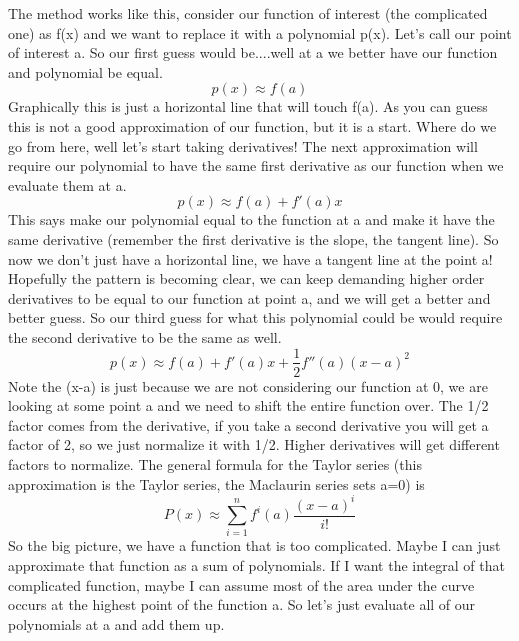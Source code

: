 \documentclass{article}
\begin{document}
The method works like this, consider our function of interest (the complicated one) as f(x) and we want to replace it with a polynomial p(x). 
Let's call our point of interest a. 
So our first guess would be....well at a we better have our function and polynomial be equal.
\begin{equation}
    p(x) \approx f(a)
\end{equation}
Graphically this is just a horizontal line that will touch f(a). 
As you can guess this is not a good approximation of our function, but it is a start. 
Where do we go from here, well let's start taking derivatives!
The next approximation will require our polynomial to have the same first derivative as our function when we evaluate them at a. 
\begin{equation}
    p(x) \approx f(a) + f'(a)x
\end{equation}
This says make our polynomial equal to the function at a and make it have the same derivative (remember the first derivative is the slope, the tangent line). 
So now we don't just have a horizontal line, we have a tangent line at the point a!
Hopefully the pattern is becoming clear, we can keep demanding higher order derivatives to be equal to our function at point a, and we will get a better and better guess. 
So our third guess for what this polynomial could be would require the second derivative to be the same as well. 
\begin{equation}
    p(x) \approx f(a) + f'(a)x + \frac{1}{2}f''(a)(x-a)^2
\end{equation}
Note the (x-a) is just because we are not considering our function at 0, we are looking at some point a and we need to shift the entire function over. 
The 1/2 factor comes from the derivative, if you take a second derivative you will get a factor of 2, so we just normalize it with 1/2. 
Higher derivatives will get different factors to normalize. 
The general formula for the Taylor series (this approximation is the Taylor series, the Maclaurin series sets a=0) is 
\begin{equation}
  P(x) \approx \sum_{i=1}^n f^i(a) \frac{(x-a)^i}{i!}
\end{equation}
So the big picture, we have a function that is too complicated. 
Maybe I can just approximate that function as a sum of polynomials. 
If I want the integral of that complicated function, maybe I can assume most of the area under the curve occurs at the highest point of the function a. 
So let's just evaluate all of our polynomials at a and add them up. 
\end{document}
